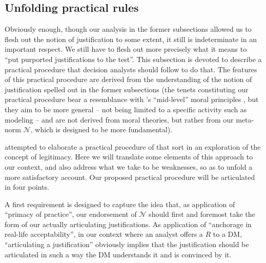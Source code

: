 \documentclass[preprint, french, english, 11pt, authoryear]{elsarticle}%
\newcommand{\adv}{\mathscr{N}}
\begin{document}
\subsection{Unfolding practical rules}
Obviously enough, though our analysis in the former subsections allowed us to flesh out the notion of justification to some extent, it still is indeterminate in an important respect. We still have to flesh out more precisely what it means to ``put purported justifications to the test''. This subsection is devoted to describe a practical procedure that decision analysts should follow to do that. The features of this practical procedure are derived from the understanding of the notion of justification spelled out in the former subsections (the tenets constituting our practical procedure bear a resemblance with \citeauthor{diekmann_moral_2013}’s \citeyearpar{diekmann_moral_2013} ``mid-level'' moral principles , but they aim to be more general -- not being limited to a specific activity such as modeling -- and are not derived from moral theories, but rather from our meta-norm $\mathscr{N}$, which is designed to be more fundamental).

\citet{meinard_what_2017} attempted to elaborate a practical procedure of that sort in an exploration of the concept of legitimacy. Here we will translate some elements of this approach to our context, and also address what we take to be weaknesses, so as to unfold a more satisfactory account. Our proposed practical procedure will be articulated in four points.

A first requirement is designed to capture the idea that, as application of “primacy of practice”, our endorsement of $\adv$ should first and foremost take the form of our actually articulating justifications. As application of ``anchorage in real-life acceptability'', in our context where an analyst offers a $R$ to a \ac{DM}, ``articulating a justification'' obviously implies that the justification should be articulated in such a way the \ac{DM} understands it and is convinced by it.
\end{document}

